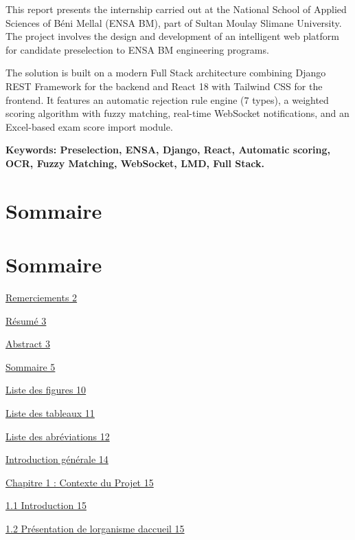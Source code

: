 \documentclass[
]{article}
\begin{document}
This report presents the internship carried out at the National School
of Applied Sciences of Béni Mellal (ENSA BM), part of Sultan Moulay
Slimane University. The project involves the design and development of
an intelligent web platform for candidate preselection to ENSA BM
engineering programs.

The solution is built on a modern Full Stack architecture combining
Django REST Framework for the backend and React 18 with Tailwind CSS for
the frontend. It features an automatic rejection rule engine (7 types),
a weighted scoring algorithm with fuzzy matching, real-time WebSocket
notifications, and an Excel-based exam score import module.

\textbf{Keywords: Preselection, ENSA, Django, React, Automatic scoring,
OCR, Fuzzy Matching, WebSocket, LMD, Full Stack.}

\hypertarget{sommaire}{%
\section{Sommaire}\label{sommaire}}

\hypertarget{sommaire-1}{%
\section{Sommaire}\label{sommaire-1}}

\protect\hyperlink{remerciements}{Remerciements 2}

\protect\hyperlink{ruxe9sumuxe9}{Résumé 3}

\protect\hyperlink{abstract}{Abstract 3}

\protect\hyperlink{sommaire}{Sommaire 5}

\protect\hyperlink{__RefHeading___Toc5287_1548811319}{Liste des figures
10}

\protect\hyperlink{__RefHeading___Toc5289_1548811319}{Liste des tableaux
11}

\protect\hyperlink{liste-des-abruxe9viations}{Liste des abréviations 12}

\protect\hyperlink{introduction-guxe9nuxe9rale}{Introduction générale
14}

\protect\hyperlink{chapitre-1-contexte-du-projet}{Chapitre 1 : Contexte
du Projet 15}

\protect\hyperlink{introduction}{1.1 Introduction 15}

\protect\hyperlink{pruxe9sentation-de-lorganisme-daccueil}{1.2
Présentation de l\textquotesingle organisme d\textquotesingle accueil
15}
\end{document}
